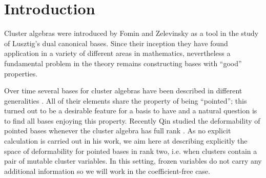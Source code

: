 \documentclass[pdflatex,sn-mathphys]{sn-jnl}%
\theoremstyle{thmstyleone}%
\theoremstyle{thmstyletwo}%
\theoremstyle{thmstylethree}%
\newcommand{\cP}{\mathcal{P}}
\newcommand{\cS}{\mathcal{S}}
\begin{document}
\begin{figure}[h!]
\end{figure}
\vspace{-1em}

\section{Introduction}\label{sec1}

  Cluster algebras were introduced by Fomin and Zelevinsky as a tool in the study of Lusztig's dual canonical bases.
  Since their inception they have found application in a variety of different areas in mathematics, nevertheless a fundamental problem in the theory remains constructing bases with ``good'' properties. 
  
  Over time several bases for cluster algebras have been described in different generalities \cite{BZ14,CI12,DT13,Dup11,Dup12,GHKK18,LLZ14,MSW13,Pla13,SZ04,T14}.
  All of their elements share the property of being ``pointed''; this turned out to be a desirable feature for a basis to have and a natural question is to find all bases enjoying this property.
  Recently Qin studied the deformability of pointed bases whenever the cluster algebra has full rank \cite{Qin19}. 
  As no explicit calculation is carried out in his work, we aim here at describing explicitly the space of deformability for pointed bases in rank two, i.e. when clusters contain a pair of mutable cluster variables.
  In this setting, frozen variables do not carry any additional information so we will work in the coefficient-free case. 
\end{document}
